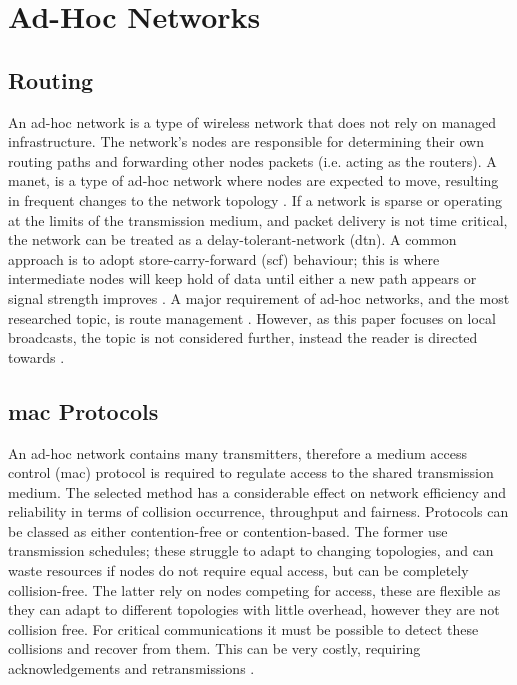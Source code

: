 \section{Ad-Hoc Networks}\label{sec:adhocnetworks}
\subsection{Routing}
An ad-hoc network is a type of wireless network that does not rely on managed infrastructure. The network's nodes are responsible for determining their own routing paths and forwarding other nodes packets (i.e. acting as the routers).  A \ac{manet}, is a type of ad-hoc network where nodes are expected to move, resulting in frequent changes to the network topology \cite{3YP:MANET_RFC2501}. If a network is sparse or operating at the limits of the transmission medium, and packet delivery is not time critical, the network can be treated as a delay-tolerant-network (\ac{dtn}). A common approach is to adopt store-carry-forward (\ac{scf}) behaviour; this is where intermediate nodes will keep hold of data until either a new path appears or signal strength improves \cite{3YP:DTNS}. A major requirement of ad-hoc networks, and the most researched  topic, is route management \cite{3YP:MANET_RESEARCH_TRENDS}. However, as this paper focuses on local broadcasts, the topic is not considered further, instead the reader is directed towards \cite{3YP:ROUTING_ALGORITHMS}.  

\subsection{\ac{mac} Protocols}
\label{sec:mac_protocol_background}
An ad-hoc network contains many transmitters, therefore a medium access control (\ac{mac}) protocol is required to regulate access to the shared transmission medium. The selected method has a considerable effect on network efficiency and reliability in terms of collision occurrence, throughput and fairness. Protocols can be classed as either contention-free or contention-based. The former use transmission schedules; these struggle to adapt to changing topologies, and can waste resources if nodes do not require equal access, but can be completely collision-free. The latter rely on nodes competing for access, these are flexible as they can adapt to different topologies with little overhead, however they are not collision free. For critical communications it must be possible to detect these collisions and recover from them. This can be very costly, requiring acknowledgements and retransmissions \cite{3YP:WSN_BOOK}.


